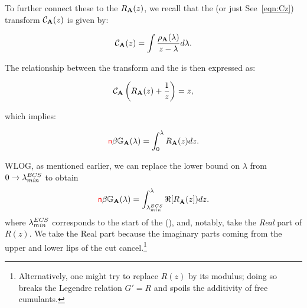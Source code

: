 To further connect these to the \RTransform $R_{\mathbf{A}}(z)$, we recall that the \CauchyStieltjes (or just \Cauchy See~\ref{eqn:Cz}) transform $\mathcal{C}_{\mathbf{A}}(z)$  is given by:

\begin{equation}
\mathcal{C}_{\mathbf{A}}(z) = \int \frac{\rho_{\mathbf{A}}(\lambda)}{z - \lambda} d\lambda.
\end{equation}

The relationship between the \Cauchy transform and the \RTransform is  then expressed as:

\begin{equation}
\mathcal{C}_{\mathbf{A}}\left(R_{\mathbf{A}}(z) + \frac{1}{z}\right) = z,
\end{equation}

which implies:

\begin{equation}
{\color{red}\sf{n}}\beta\mathbb{G}_{\mathbf{A}}(\lambda) = \int_0^{\lambda} R_{\mathbf{A}}(z) dz.
\end{equation}

WLOG, as mentioned earlier, we can replace the lower bound on $\lambda$ from
$0\rightarrow\lambda^{ECS}_{min}$ to obtain
\begin{equation}
{\color{red}\sf{n}}\beta\mathbb{G}_{\mathbf{A}}(\lambda) = \int_{\lambda^{ECS}_{min}}^{\lambda} \Re[R_{\tilde{\mathbf{A}}}(z]) dz.
\end{equation}
where $\lambda^{ECS}_{min}$ corresponds to the start of the \EffectiveCorrelationSpace (\ECS),
and, notably,  take the \emph{Real} part of $R(z)$.
We take the Real part because the imaginary parts coming from the upper and lower lips of
the cut cancel.\footnote{
Alternatively, one might try to replace $R(z)$ by its modulus;
doing so breaks the Legendre relation $G' = R$ and spoils the
additivity of free cumulants.}

